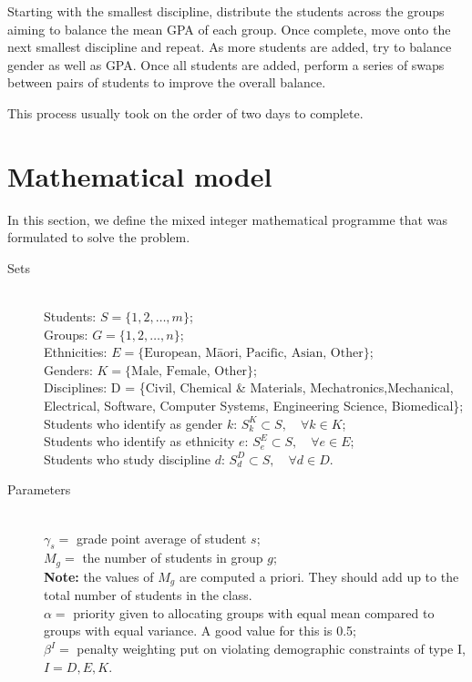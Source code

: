 \documentclass[12pt]{ORSNZ}
\begin{document}
Starting with the smallest discipline, distribute the students across the groups aiming to balance the mean GPA of each group. Once complete, move onto the next smallest discipline and repeat. As more students are added, try to balance gender as well as GPA. Once all students are added, perform a series of swaps between pairs of students to improve the overall balance.

This process usually took on the order of two days to complete.

\section{Mathematical model}
In this section, we define the mixed integer mathematical programme that was formulated to solve the problem.
\begin{description}
\item[Sets] \mbox{}\\
        Students: $S = \{1, 2, \dots, m\}$;\\
        Groups: $G = \{1, 2, \dots, n\}$;\\
        Ethnicities: $E = \{\mbox{European, M\=aori, Pacific, Asian, Other}\}$;\\
        Genders: $K = \{\mbox{Male, Female, Other}\}$;\\
        Disciplines: D = \{Civil, Chemical \& Materials, Mechatronics,Mechanical, Electrical, Software, Computer Systems, Engineering Science, Biomedical\};
        Students who identify as gender $k$: $S^K_k \subset S, \quad \forall k \in K$;\\
        Students who identify as ethnicity $e$: $S^E_e \subset S, \quad \forall e \in E$;\\
        Students who study discipline $d$: $S^D_d \subset S, \quad \forall d \in D$.



\item[Parameters] \mbox{} \\
$\gamma_s = $ grade point average of student $s$; \\
$M_g = $ the number of students in group $g$;\\
\textbf{Note:} the values of $M_g$ are computed a priori. They should add up to the total number of students in the class.\\
$\alpha = $ priority given to allocating groups with equal mean compared to groups with equal variance. A good value for this is 0.5;\\
$\beta^I = $ penalty weighting put on violating demographic constraints of type I, $I= D, E, K$.


\end{description}
\end{document}
